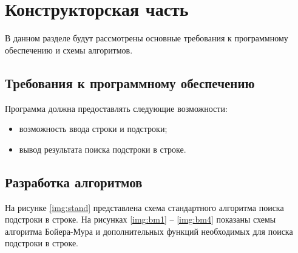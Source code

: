 \chapter{Конструкторская часть}

В данном разделе будут рассмотрены основные требования к программному обеспечению и схемы алгоритмов.

\section{Требования к программному обеспечению}

Программа должна предоставлять следующие возможности:
\begin{itemize}[left=\parindent]
    \item возможность ввода строки и подстроки;
    \item вывод результата поиска подстроки в строке.
\end{itemize}

\section{Разработка алгоритмов}

На рисунке \ref{img:stand} представлена схема стандартного алгоритма поиска подстроки в строке. На рисунках \ref{img:bm1} -- \ref{img:bm4} показаны
схемы алгоритма Бойера-Мура и дополнительных функций необходимых для поиска подстроки в строке.

